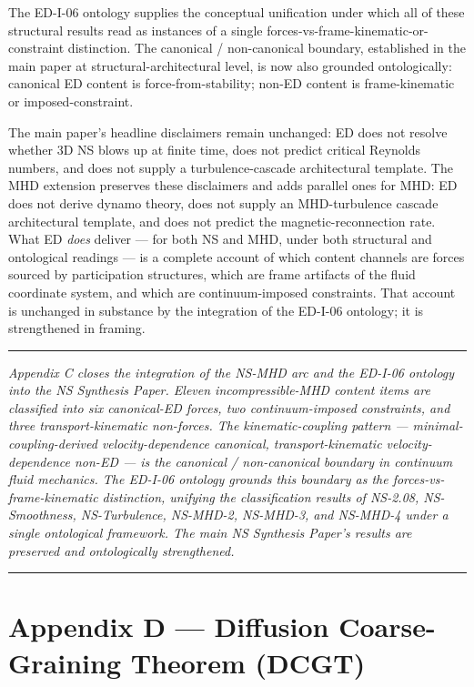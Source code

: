 \documentclass[
]{article}
\begin{document}
The ED-I-06 ontology supplies the conceptual unification under which all
of these structural results read as instances of a single
forces-vs-frame-kinematic-or-constraint distinction. The canonical /
non-canonical boundary, established in the main paper at
structural-architectural level, is now also grounded ontologically:
canonical ED content is force-from-stability; non-ED content is
frame-kinematic or imposed-constraint.

The main paper's headline disclaimers remain unchanged: ED does not
resolve whether 3D NS blows up at finite time, does not predict critical
Reynolds numbers, and does not supply a turbulence-cascade architectural
template. The MHD extension preserves these disclaimers and adds
parallel ones for MHD: ED does not derive dynamo theory, does not supply
an MHD-turbulence cascade architectural template, and does not predict
the magnetic-reconnection rate. What ED \emph{does} deliver --- for both
NS and MHD, under both structural and ontological readings --- is a
complete account of which content channels are forces sourced by
participation structures, which are frame artifacts of the fluid
coordinate system, and which are continuum-imposed constraints. That
account is unchanged in substance by the integration of the ED-I-06
ontology; it is strengthened in framing.

\begin{center}\rule{0.5\linewidth}{0.5pt}\end{center}

\emph{Appendix C closes the integration of the NS-MHD arc and the
ED-I-06 ontology into the NS Synthesis Paper. Eleven incompressible-MHD
content items are classified into six canonical-ED forces, two
continuum-imposed constraints, and three transport-kinematic non-forces.
The kinematic-coupling pattern --- minimal-coupling-derived
velocity-dependence canonical, transport-kinematic velocity-dependence
non-ED --- is the canonical / non-canonical boundary in continuum fluid
mechanics. The ED-I-06 ontology grounds this boundary as the
forces-vs-frame-kinematic distinction, unifying the classification
results of NS-2.08, NS-Smoothness, NS-Turbulence, NS-MHD-2, NS-MHD-3,
and NS-MHD-4 under a single ontological framework. The main NS Synthesis
Paper's results are preserved and ontologically strengthened.}

\begin{center}\rule{0.5\linewidth}{0.5pt}\end{center}

\section{Appendix D --- Diffusion Coarse-Graining Theorem
(DCGT)}\label{appendix-d-diffusion-coarse-graining-theorem-dcgt}
\end{document}
